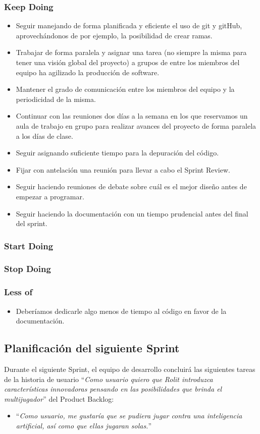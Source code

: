 \documentclass[../../FINAL/Scrum/SCRUM.tex]{subfiles}
\begin{document}
\subsubsection*{Keep Doing}
\begin{itemize}
\item
  Seguir manejando de forma planificada y eficiente el uso de git y
  gitHub, aprovechándonos de por ejemplo, la posibilidad de crear ramas.
\item
  Trabajar de forma paralela y asignar una tarea (no siempre la misma
  para tener una visión global del proyecto) a grupos de entre los
  miembros del equipo ha agilizado la producción de software.
\item
  Mantener el grado de comunicación entre los miembros del equipo y la
  periodicidad de la misma.
\item
  Continuar con las reuniones dos días a la semana en los que reservamos
  un aula de trabajo en grupo para realizar avances del proyecto de
  forma paralela a los días de clase.
\item
  Seguir asignando suficiente tiempo para la depuración del código.
\item
  Fijar con antelación una reunión para llevar a cabo el Sprint Review.
\item
  Seguir haciendo reuniones de debate sobre cuál es el mejor diseño
  antes de empezar a programar.
\item
  Seguir haciendo la documentación con un tiempo prudencial antes del
  final del sprint.
\end{itemize}

\subsubsection*{Start Doing}

\subsubsection*{Stop Doing}

\subsubsection*{Less of}
\begin{itemize}
\item
  Deberíamos dedicarle algo menos de tiempo al código en favor de la
  documentación.
\end{itemize}

\subsection{Planificación del siguiente Sprint}
Durante el siguiente Sprint, el equipo de desarrollo concluirá las siguientes tareas de la historia de usuario ``\textit{Como usuario quiero que Rolit introduzca características innovadoras pensando en las posibilidades que brinda el multijugador}'' del Product Backlog:
\begin{itemize}
\item ``\textit{Como usuario, me gustaría que se pudiera jugar
contra una inteligencia artificial, así como que ellas jugaran solas.}''
\end{itemize}
\end{document}
